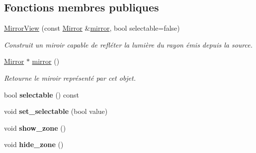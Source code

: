 \subsection*{Fonctions membres publiques}
\begin{DoxyCompactItemize}
\item 
\hyperlink{classMirrorView_a04dab41c29196186c918e60a1b2487b2}{Mirror\+View} (const \hyperlink{classMirror}{Mirror} \&\hyperlink{classMirrorView_a61c25961d7e140d5a8ff38aeb5ce8da2}{mirror}, bool selectable=false)
\begin{DoxyCompactList}\small\item\em Construit un miroir capable de refléter la lumière du rayon émis depuis la source. \end{DoxyCompactList}\item 
\hyperlink{classMirror}{Mirror} $\ast$ \hyperlink{classMirrorView_a61c25961d7e140d5a8ff38aeb5ce8da2}{mirror} ()
\begin{DoxyCompactList}\small\item\em Retourne le miroir représenté par cet objet. \end{DoxyCompactList}\item 
\hypertarget{classMirrorView_ad52e5d438a1b61b135c2ca56cadcd090}{bool {\bfseries selectable} () const }\label{classMirrorView_ad52e5d438a1b61b135c2ca56cadcd090}

\item 
\hypertarget{classMirrorView_a67fc521e337191818dba7c1abfbb6e84}{void {\bfseries set\+\_\+selectable} (bool value)}\label{classMirrorView_a67fc521e337191818dba7c1abfbb6e84}

\item 
\hypertarget{classMirrorView_ac9a758db6d2c5c99e1f5923a6248d296}{void {\bfseries show\+\_\+zone} ()}\label{classMirrorView_ac9a758db6d2c5c99e1f5923a6248d296}

\item 
\hypertarget{classMirrorView_a64fbd2447cb892fd6ffebf14a525c806}{void {\bfseries hide\+\_\+zone} ()}\label{classMirrorView_a64fbd2447cb892fd6ffebf14a525c806}


\end{DoxyCompactItemize}
